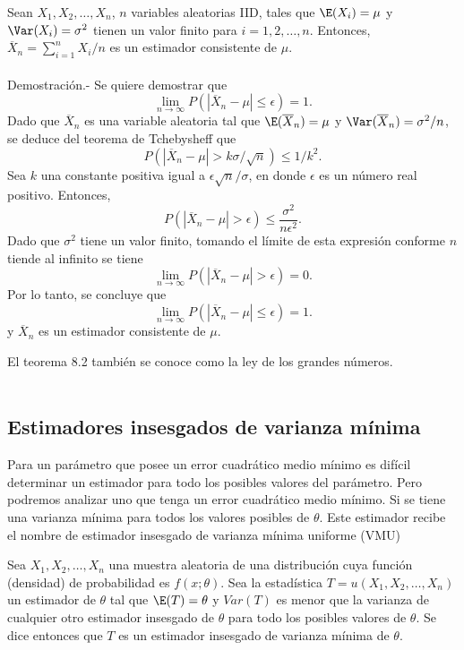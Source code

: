 \begin{teo}
    Sean $X_1,X_2,\ldots,X_n$, $n$ variables aleatorias IID, tales que $\E(X_i)=\mu$ y $\Var(X_i)=\sigma^2$ tienen un valor finito para $i=1,2,\ldots,n.$ Entonces, $\overline{X}_n=\sum_{i=1}^n X_i/n$ es un estimador consistente de $\mu$.\\\\
	Demostración.-\; Se quiere demostrar que
	$$\lim_{n\to \infty}P(|\overline{X}_n-\mu|\leq \epsilon)=1.$$
	Dado que $\overline{X}_n$ es una variable aleatoria tal que $\E(\overline{X}_n)=\mu$ y $\Var(\overline{X}_n)=\sigma^2/n$, se deduce del teorema de Tchebysheff que
	$$P(|\overline{X}_n-\mu|>k\sigma/\sqrt{n})\leq 1/k^2.$$
    Sea $k$ una constante positiva igual a $\epsilon\sqrt{n}/\sigma$, en donde $\epsilon$ es un número real positivo. Entonces,
	$$P(|\overline{X}_n-\mu|>\epsilon)\leq \dfrac{\sigma^2}{n\epsilon^2}.$$
	Dado que $\sigma^2$ tiene un valor finito, tomando el límite de esta expresión conforme $n$ tiende al infinito se tiene
	$$\lim_{n\to \infty}P(|\overline{X}_n-\mu|> \epsilon)=0.$$
	Por lo tanto, se concluye que
	$$\lim_{n\to \infty}P(|\overline{X}_n-\mu|\leq \epsilon)=1.$$
	y $\overline{X}_n$ es un estimador consistente de $\mu$.
\end{teo}

El teorema 8.2 también se conoce como la ley de los grandes números.\\\\


\subsection{Estimadores insesgados de varianza mínima}

Para un parámetro que posee un error cuadrático medio mínimo es difícil determinar un estimador para todo los posibles valores del parámetro. Pero podremos analizar uno que tenga un error cuadrático medio mínimo. Si se tiene una varianza mínima para todos los valores posibles de $\theta$. Este estimador recibe el nombre de estimador insesgado de varianza mínima uniforme (VMU)

\begin{def.}
    Sea $X_1,X_2,\ldots,X_n$ una muestra aleatoria de una distribución cuya función (densidad) de probabilidad es $f(x;\theta)$. Sea la estadística $T=u(X_1,X_2,\ldots,X_n)$ un estimador de $\theta$ tal que $\E(T)=\theta$ y $Var(T)$ es menor que la varianza de cualquier otro estimador insesgado de $\theta$ para todo los posibles valores de $\theta$. Se dice entonces que $T$ es un estimador insesgado de varianza mínima de $\theta$.
\end{def.}

